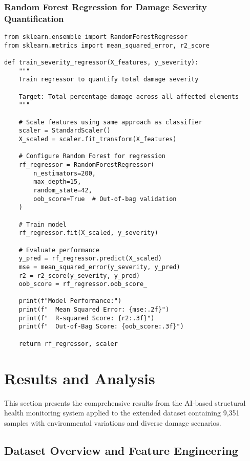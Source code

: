 \documentclass[11pt,a4paper]{article}
\begin{document}
\subsubsection{Random Forest Regression for Damage Severity Quantification}

\begin{lstlisting}[caption={Random Forest Regressor for Severity Prediction}]
from sklearn.ensemble import RandomForestRegressor
from sklearn.metrics import mean_squared_error, r2_score

def train_severity_regressor(X_features, y_severity):
    """
    Train regressor to quantify total damage severity
    
    Target: Total percentage damage across all affected elements
    """
    
    # Scale features using same approach as classifier
    scaler = StandardScaler()
    X_scaled = scaler.fit_transform(X_features)
    
    # Configure Random Forest for regression
    rf_regressor = RandomForestRegressor(
        n_estimators=200,
        max_depth=15,
        random_state=42,
        oob_score=True  # Out-of-bag validation
    )
    
    # Train model
    rf_regressor.fit(X_scaled, y_severity)
    
    # Evaluate performance
    y_pred = rf_regressor.predict(X_scaled)
    mse = mean_squared_error(y_severity, y_pred)
    r2 = r2_score(y_severity, y_pred)
    oob_score = rf_regressor.oob_score_
    
    print(f"Model Performance:")
    print(f"  Mean Squared Error: {mse:.2f}")
    print(f"  R-squared Score: {r2:.3f}")
    print(f"  Out-of-Bag Score: {oob_score:.3f}")
    
    return rf_regressor, scaler
\end{lstlisting}

\section{Results and Analysis}

This section presents the comprehensive results from the AI-based structural health monitoring system applied to the extended dataset containing 9,351 samples with environmental variations and diverse damage scenarios.

\subsection{Dataset Overview and Feature Engineering}
\end{document}
